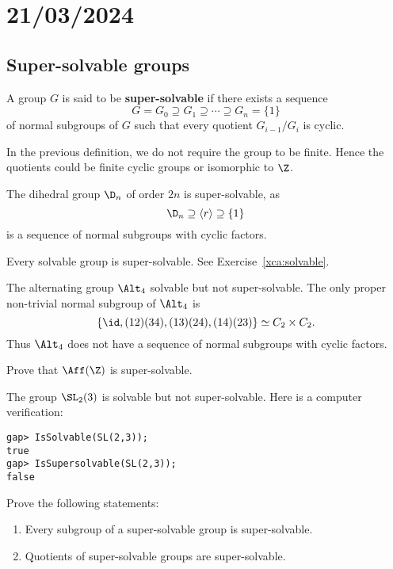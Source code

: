 \section{21/03/2024}


\subsection{Super-solvable groups}

\begin{definition}
A group $G$ is said to be \textbf{super-solvable} if there exists a sequence 
\[
G=G_0\supseteq G_1\supseteq\cdots\supseteq G_n=\{1\}
\]
of normal subgroups of $G$ such that every 
quotient $G_{i-1}/G_i$ is cyclic. 
\end{definition}

In the previous definition, we do not require the group to be finite. Hence the quotients 
could be finite cyclic groups or isomorphic to $\Z$. 

\begin{example}
The dihedral group $\D_{n}$ of order $2n$ is super-solvable, as 
\[	
\D_{n}\supseteq \langle
r\rangle\supseteq \{1\}
\]
is a sequence of normal subgroups with cyclic factors. 
\end{example}

Every solvable group is super-solvable. See Exercise~\ref{xca:solvable}.

\begin{example}
The alternating group $\Alt_4$ solvable but not super-solvable. The only 
proper non-trivial normal subgroup of $\Alt_4$ is 
	\[
	\{\id,(12)(34),(13)(24),(14)(23)\}\simeq C_2\times C_2.
	\]
Thus $\Alt_4$ does not have a sequence of normal subgroups 
with cyclic factors. 
\end{example}

\begin{exercise}
\label{xca:Aff_supersolvable}
Prove that $\Aff(\Z)$ is super-solvable. 
\end{exercise}

\begin{example}
The group $\SL_2(3)$ is solvable but not super-solvable. Here is a computer verification: 
\begin{lstlisting}
gap> IsSolvable(SL(2,3));
true
gap> IsSupersolvable(SL(2,3));
false
\end{lstlisting}
\end{example}

\begin{exercise}
\label{xca:super}
Prove the following statements: 
\begin{enumerate}
\item Every subgroup of a super-solvable group is super-solvable. 
\item Quotients of super-solvable groups are super-solvable. 
\end{enumerate}
\end{exercise}

